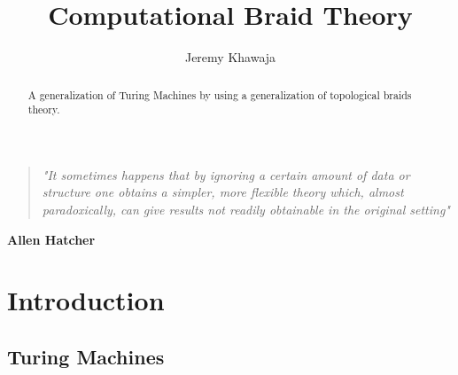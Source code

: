 \documentclass[english, twocolumn]{article}
\begin{document}
	
\hypersetup{linktocpage}

\title{Computational Braid Theory}

\author{Jeremy Khawaja}

\onecolumn
\maketitle
	
\begin{abstract}
		A generalization of Turing Machines by using a generalization of topological braids theory.
\end{abstract}
	
\twocolumn
\onecolumn
\tableofcontents{}
\twocolumn
\onecolumn
\begin{quotation}
				
	\begin{center}
				
	\textsl{ "{\footnotesize It sometimes happens that by ignoring a certain amount of data or structure one obtains a simpler, more flexible theory which, almost paradoxically, can give results not readily obtainable in the original setting}"}
				
	\end{center}
					
\end{quotation}

\begin{center}
			
	\textbf{{\small Allen Hatcher}}
			
\end{center}
			
\twocolumn

\newcommand\myeq{\mathrel{\overset{\makebox[0pt]{\mbox{\normalfont\tiny def}}}{=}}}

\newtheorem{defi}{Definition}[section]

\newtheorem{examp}{Example}[section]

\newtheorem{cor}{Corollary}[section]

\newtheorem{theor}{Theorem}[section]

\newtheorem{lem}{Lemma}[section]

\section{Introduction}

\subsection{Turing Machines}
\end{document}
